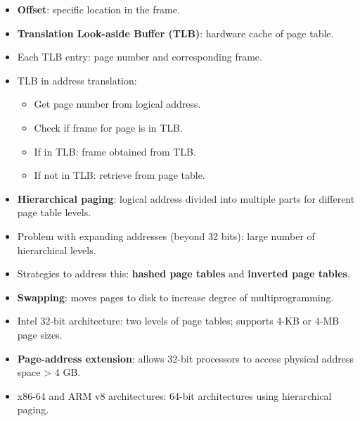 \begin{itemize}
    \item \textbf{Offset}: specific location in the frame.
    \item \textbf{Translation Look-aside Buffer (TLB)}: hardware cache of page table.
    \item Each TLB entry: page number and corresponding frame.
    \item TLB in address translation:
    \begin{itemize}
        \item Get page number from logical address.
        \item Check if frame for page is in TLB.
        \item If in TLB: frame obtained from TLB.
        \item If not in TLB: retrieve from page table.
    \end{itemize}
    \item \textbf{Hierarchical paging}: logical address divided into multiple parts for different page table levels.
    \item Problem with expanding addresses (beyond 32 bits): large number of hierarchical levels.
    \item Strategies to address this: \textbf{hashed page tables} and \textbf{inverted page tables}.
    \item \textbf{Swapping}: moves pages to disk to increase degree of multiprogramming.
    \item Intel 32-bit architecture: two levels of page tables; supports 4-KB or 4-MB page sizes.
    \item \textbf{Page-address extension}: allows 32-bit processors to access physical address space > 4 GB.
    \item x86-64 and ARM v8 architectures: 64-bit architectures using hierarchical paging.
\end{itemize}

